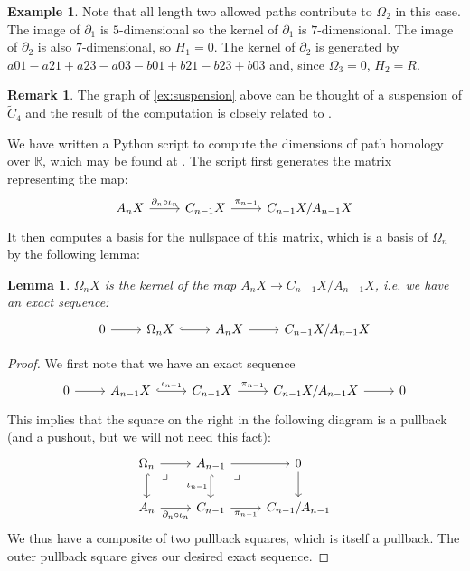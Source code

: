 \documentclass[11pt]{article}
\newtheorem{lemma}[theo]{Lemma}
\theoremstyle{definition}
\newtheorem{remark}[theo]{Remark}
\newtheorem{example}[theo]{Example}
\numberwithin{equation}{section}
\newcommand{\bd}{\partial}
\begin{document}
\begin{example}
Note that all length two allowed paths contribute to $\Omega_2$ in this case. The image of $\bd_1$ is $5$-dimensional so the kernel of $\bd_1$ is $7$-dimensional.
The image of $\bd_2$ is also $7$-dimensional, so $H_1 = 0$.
The kernel of $\bd_2$ is generated by $a01-a21+a23-a03-b01+b21-b23+b03$ and, since $\Omega_3=0$, $H_2 = R$. 
\end{example}

\begin{remark} 
The graph of \cref{ex:suspension} above can be thought of a suspension of $\tilde C_4$ and the result of the computation is closely related to \cite[Prop.~5.10]{grigor'yan-lin-muranov-yau}.
\end{remark}

We have written a Python script to compute the dimensions of path homology over $\mathbb{R}$, which may be found at \cite{python_script}.
The script first generates the matrix representing the map:
    \[
        \begin{tikzcd}
            A_n X \rar["\bd_n \circ \iota_n"] &
            C_{n-1} X \rar["\pi_{n-1}"] &
            C_{n-1} X / A_{n-1} X
        \end{tikzcd}
    \]  
It then computes a basis for the nullspace of this matrix, which is a basis of $\Omega_n$ by the following lemma:

\begin{lemma} \label{omega_kernel}
    $\Omega_n X$ is the kernel of the map $A_n X \to C_{n-1} X/ A_{n-1} X$, i.e. we have an exact sequence:
    \[
        \begin{tikzcd}
            0 \rar & 
            \Omega_n X \rar[hookrightarrow] &
            A_n X \rar &
            C_{n-1} X / A_{n-1} X
        \end{tikzcd}
    \]  
\end{lemma}

\begin{proof}
    We first note that we have an exact sequence
    \[
        \begin{tikzcd}
            0 \rar & 
            A_{n-1} X \rar["\iota_{n-1}",hookrightarrow] &
            C_{n-1} X \rar["\pi_{n-1}"] &
            C_{n-1} X / A_{n-1} X  \rar &
            0
        \end{tikzcd}
    \]     
    This implies that the square on the right in the following diagram is a pullback (and a pushout, but we will not need this fact):
    \[
        \begin{tikzcd}
            \Omega_n \rar \dar[hookrightarrow]  \ar[dr, phantom, very near start, "\lrcorner"]
            &
            A_{n-1} \dar["\iota_{n-1}"', hookrightarrow] \rar \ar[dr, phantom, very near start, "\lrcorner"]
            & 
            0 \dar
            \\
            A_n \rar["\bd_n \circ \iota_n"']
            &
            C_{n-1} \rar["\pi_{n-1}"'] 
            & 
            C_{n-1}/A_{n-1}
        \end{tikzcd}
    \]
    We thus have a composite of two pullback squares, which is itself a pullback.
    The outer pullback square gives our desired exact sequence.
\end{proof}
\end{document}
